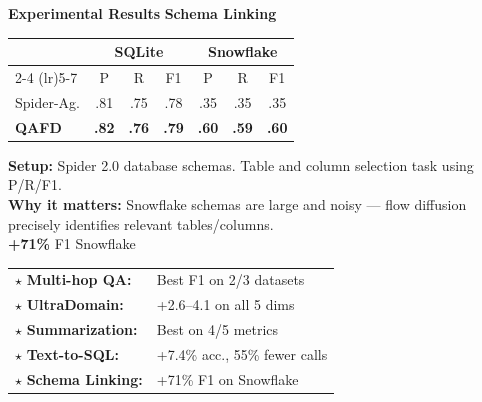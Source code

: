 \documentclass[final]{beamer}
\newlength{\colC}\setlength{\colC}{0.26\paperwidth}   %
\begin{document}
\begin{frame}[t]
\begin{columns}[t]
\begin{column}{\colC}
\begin{block}{\Large\textbf{\color{samsungblue} Experimental Results}}
\textbf{\large\color{samsungblue} Schema Linking}\par\vspace{0.3em}
\begin{table}
\vspace{-0.8em}
\scriptsize
\begin{tabular}{l ccc ccc}
  \toprule
  & \multicolumn{3}{c}{\textbf{SQLite}} & \multicolumn{3}{c}{\textbf{Snowflake}} \\
  \cmidrule(lr){2-4} \cmidrule(lr){5-7}
  & P & R & F1 & P & R & F1 \\
  \midrule
  Spider-Ag. & .81 & .75 & .78 & .35 & .35 & .35 \\
  \textbf{QAFD} & \textbf{.82} & \textbf{.76} & \textbf{.79} & \textbf{.60} & \textbf{.59} & \textbf{.60} \\
  \bottomrule
\end{tabular}
\vspace{-0.8em}
\end{table}
\noindent\scriptsize
\textbf{Setup:} Spider 2.0 database schemas. Table and column selection task using P/R/F1.\\[3pt]
\textbf{Why it matters:} Snowflake schemas are large and noisy --- flow diffusion precisely identifies relevant tables/columns.\\[3pt]
\colorbox{accentgreen!15}{\textcolor{accentgreen}{\textbf{+71\%}} F1 Snowflake}\par

\end{block}

\vspace{-0.3cm}

\begin{tcolorbox}[colback=golden!15, colframe=golden!75!black, boxrule=1.5pt, arc=3pt, title={\textbf{\normalsize Summary}}]
\footnotesize
\begin{tabular}{ll}
  {\color{golden}$\star$} \textbf{Multi-hop QA:}    & Best F1 on 2/3 datasets \\[2pt]
  {\color{golden}$\star$} \textbf{UltraDomain:}     & +2.6--4.1 on all 5 dims \\[2pt]
  {\color{golden}$\star$} \textbf{Summarization:}   & Best on 4/5 metrics \\[2pt]
  {\color{golden}$\star$} \textbf{Text-to-SQL:}     & +7.4\% acc., 55\% fewer calls \\[2pt]
  {\color{golden}$\star$} \textbf{Schema Linking:}  & +71\% F1 on Snowflake \\
\end{tabular}
\end{tcolorbox}


\end{column}
\end{columns}
\end{frame}
\end{document}
